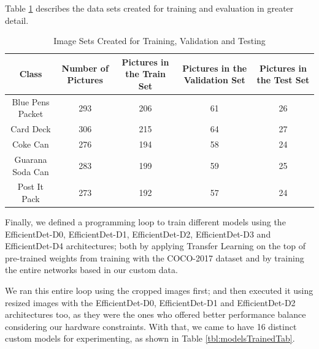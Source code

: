 \documentclass[openright]{normas-utf-tex} %
\begin{document}
Table \ref{tbl:imageSetsTab} describes the data sets created for training and evaluation in greater detail.

\begin{table}[H]
	\centering
	\begin{adjustbox}{width=1\textwidth}
	\label{tab:imageSets}
	\begin{tabular}{c|c|c|c|c}
		\hline 
		Class & Number of Pictures & Pictures in the Train Set & Pictures in the Validation Set & Pictures in the Test Set \\
		\hline
        Blue Pens Packet & 293 & 206 & 61 & 26\\
		Card Deck & 306 & 215 & 64 & 27\\
		Coke Can & 276 & 194 & 58 & 24\\
		Guarana Soda Can & 283 & 199 & 59 & 25\\
		Post It Pack & 273 & 192 & 57 & 24\\
		\hline 
	\end{tabular}
	\end{adjustbox}
	\caption[Image Sets Created for Training, Validation and Testing]{Image Sets Created for Training, Validation and Testing}
	\label{tbl:imageSetsTab}
\end{table}

Finally, we defined a programming loop to train different models using the EfficientDet-D0,
EfficientDet-D1, EfficientDet-D2, EfficientDet-D3 and EfficientDet-D4 architectures; both by
applying Transfer Learning on the top of pre-trained weights from training with the COCO-2017 dataset 
and by training the entire networks based in our custom data. 

We ran this entire loop using the cropped images first; and then executed it using resized images with the EfficientDet-D0,
EfficientDet-D1 and EfficientDet-D2 architectures too, as they were the ones who offered better
performance balance considering our hardware constraints. 
With that, we came to have 16 distinct custom models for experimenting, as shown in Table \ref{tbl:modelsTrainedTab}.
\end{document}
